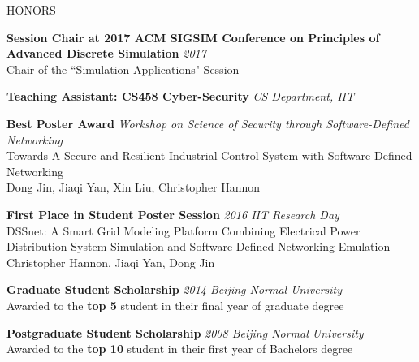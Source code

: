 \documentclass{resume} %
\begin{document}

\begin{rSection}{HONORS}

{\bf Session Chair at 2017 ACM SIGSIM Conference on Principles of Advanced Discrete Simulation} \hfill {\em 2017}\\
Chair of the ``Simulation Applications" Session

{\bf Teaching Assistant: CS458 Cyber-Security} \hfill {\em CS Department, IIT}

{\bf {\color{red}Best} Poster Award} \hfill {\em Workshop on Science of Security through Software-Defined Networking}\\
Towards A Secure and Resilient Industrial Control System with Software-Defined Networking \\
Dong Jin, Jiaqi Yan, Xin Liu, Christopher Hannon

{\bf {\color{red}First Place} in Student Poster Session} \hfill {\em 2016 IIT Research Day} \\
DSSnet: A Smart Grid Modeling Platform Combining Electrical Power Distribution System Simulation and Software Defined Networking Emulation \\
Christopher Hannon, Jiaqi Yan, Dong Jin

{\bf Graduate Student Scholarship} \hfill {\em 2014 Beijing Normal University} \\
Awarded to the \textbf{top 5} student in their final year of graduate degree

{\bf Postgraduate Student Scholarship} \hfill {\em 2008 Beijing Normal University} \\
{Awarded to the \textbf{top 10} student in their first year of Bachelors degree}

\end{rSection}

\end{document}

